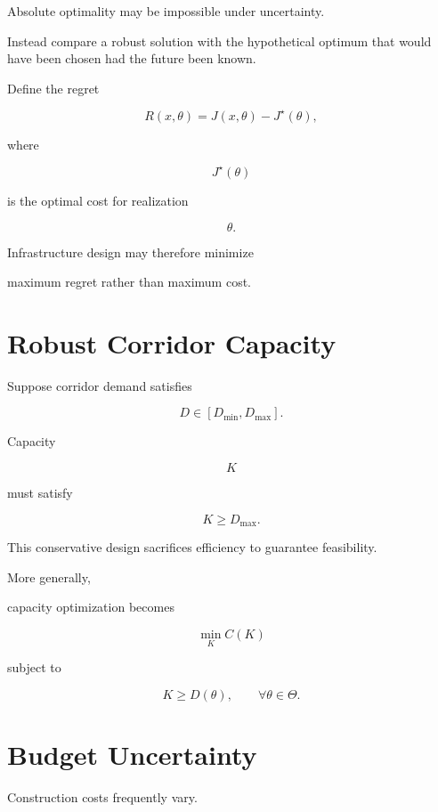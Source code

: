 \documentclass[11pt,fleqn]{book}
\numberwithin{equation}{chapter}
\theoremstyle{plain}
\theoremstyle{definition}
\theoremstyle{remark}
\begin{document}
Absolute optimality may be impossible under uncertainty.

Instead compare a robust solution with the hypothetical optimum that
would have been chosen had the future been known.

Define the regret

\[
\boxed{
R(x,\theta)
=
J(x,\theta)
-
J^\star(\theta),
}
\]

where

\[
J^\star(\theta)
\]

is the optimal cost for realization

\[
\theta.
\]


Infrastructure design may therefore minimize

maximum regret rather than maximum cost.


\section{Robust Corridor Capacity}

Suppose corridor demand satisfies

\[
D\in[D_{\min},D_{\max}].
\]

Capacity

\[
K
\]

must satisfy

\[
K
\ge
D_{\max}.
\]

This conservative design sacrifices efficiency to guarantee feasibility.


More generally,

capacity optimization becomes

\[
\min_K
C(K)
\]

subject to

\[
K
\ge
D(\theta),
\qquad
\forall\theta\in\Theta.
\]


\section{Budget Uncertainty}

Construction costs frequently vary.
\end{document}
